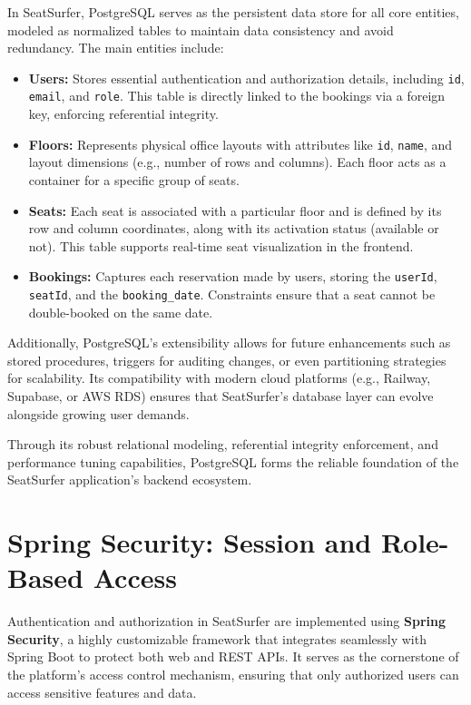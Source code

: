 \documentclass[12pt,a4paper]{report} %
\begin{document}
In SeatSurfer, PostgreSQL serves as the persistent data store for all core entities, modeled as normalized tables to maintain data consistency and avoid redundancy. The main entities include:

\begin{itemize}
\item \textbf{Users:} Stores essential authentication and authorization details, including \texttt{id}, \texttt{email}, and \texttt{role}. This table is directly linked to the bookings via a foreign key, enforcing referential integrity.
\item \textbf{Floors:} Represents physical office layouts with attributes like \texttt{id}, \texttt{name}, and layout dimensions (e.g., number of rows and columns). Each floor acts as a container for a specific group of seats.
\item \textbf{Seats:} Each seat is associated with a particular floor and is defined by its row and column coordinates, along with its activation status (available or not). This table supports real-time seat visualization in the frontend.
\item \textbf{Bookings:} Captures each reservation made by users, storing the \texttt{userId}, \texttt{seatId}, and the \texttt{booking\_date}. Constraints ensure that a seat cannot be double-booked on the same date.
\end{itemize}

Additionally, PostgreSQL's extensibility allows for future enhancements such as stored procedures, triggers for auditing changes, or even partitioning strategies for scalability. Its compatibility with modern cloud platforms (e.g., Railway, Supabase, or AWS RDS) ensures that SeatSurfer's database layer can evolve alongside growing user demands.

Through its robust relational modeling, referential integrity enforcement, and performance tuning capabilities, PostgreSQL forms the reliable foundation of the SeatSurfer application's backend ecosystem.

\section{Spring Security: Session and Role-Based Access}

Authentication and authorization in SeatSurfer are implemented using \textbf{Spring Security}, a highly customizable framework that integrates seamlessly with Spring Boot to protect both web and REST APIs. It serves as the cornerstone of the platform's access control mechanism, ensuring that only authorized users can access sensitive features and data.
\end{document}
